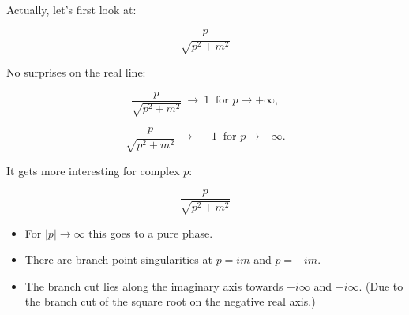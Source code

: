 \documentclass{beamer}
\newcommand{\sqrtpm}{\sqrt{p^2 + m^2}}
\newcommand{\envelope}{\frac{p}{\sqrtpm}}
\begin{document}
\begin{frame}
Actually, let's first look at:

$$\envelope$$

\pause
No surprises on the real line:

\pause
$$\envelope \ \rightarrow \ 1 \ \textrm{ for } p \rightarrow +\infty,$$

$$\envelope \ \rightarrow \ -1 \ \textrm{ for } p \rightarrow -\infty.$$

\end{frame}




\begin{frame}
It gets more interesting for complex $p$:

$$\envelope$$

\begin{itemize}

\pause
\item For $|p| \rightarrow \infty$ this goes to  a pure phase.

\pause
\item There are branch point \alert{singularities} at $p = im$ and $p = -im$.

\pause
\item The \alert{branch cut} lies along the imaginary axis towards $+i\infty$ and $-i\infty$.
(Due to the branch cut of the square root on the negative real axis.)
\end{itemize}
\end{frame}



\end{document}
